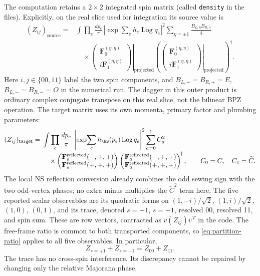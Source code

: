 The computation retains a $2\times2$ integrated spin matrix
(called \texttt{density} in the files). Explicitly, on the real
slice used for integration its source value is
\begin{align}
 (Z_{ij})_{\mathrm{source}}
 ={}&\int\prod_e\frac{dp_e}{\pi}\,
 \left|\exp\!\sum_e h_e\operatorname{Log}q_e\right|^2
 \sum_{\eta=\pm1}\frac{B_{L,\eta}B_{R,\eta}}4\nonumber\\[-2pt]
 &\quad\times
 \left.\begin{pmatrix}\mathbf F_0^{(\eta,\eta)}\\
                      i\mathbf F_1^{(\eta,\eta)}\end{pmatrix}
       \right|_{\mathrm{projected}}
 \left(\left.\begin{pmatrix}\mathbf F_0^{(\eta,\eta)}\\
                      i\mathbf F_1^{(\eta,\eta)}\end{pmatrix}
       \right|_{\mathrm{projected}}\right)^{\!\dagger}.
 \label{eq:partition-source-density}
\end{align}
Here $i,j\in\{00,11\}$ label the two spin components, and
$B_{L,+}=B_{R,+}=E$, $B_{L,-}=B_{R,-}=O$ in the numerical run.
The dagger in this outer product is ordinary complex conjugate
transpose on this real slice, not the bilinear BPZ operation.
The target matrix uses its own momenta, primary factor and
plumbing parameters:
\begin{align}
 (Z_{ij})_{\mathrm{target}}
 ={}&\int\prod_e\frac{dp_e}{\pi}\,
 \left|\exp\!\sum_e h_{\NS}(p_e)\operatorname{Log}q_e\right|^2
 \sum_{a=0}^1 C_a^2\nonumber\\[-2pt]
 &\quad\times
 \begin{pmatrix}\mathbf F_a^{\mathrm{reflected}}(-,+,+)\\
                 \mathbf F_a^{\mathrm{reflected}}(+,+,+)\end{pmatrix}
 \begin{pmatrix}\mathbf F_a^{\mathrm{reflected}}(-,+,+)\\
                 \mathbf F_a^{\mathrm{reflected}}(+,+,+)\end{pmatrix}^{\!\dagger},
 \qquad C_0=C,\quad C_1=\widetilde C.
 \label{eq:partition-target-density}
\end{align}
The local NS reflection conversion already combines the odd
sewing sign with the two odd-vertex phases; no extra minus
multiplies the $\widetilde C^2$ term here.
The five reported scalar
observables are its quadratic forms on
$(1,-i)/\sqrt2$, $(1,i)/\sqrt2$, $(1,0)$, $(0,1)$, and its
trace, denoted $s=+1$, $s=-1$, resolved 00, resolved 11, and
spin sum. These are row vectors, contracted as
$v(Z_{ij})\overline v^{\,T}$ in the code. The free-frame
ratio is common to both transported components, so
\eqref{eq:partition-ratio} applies to all five observables.
In particular,
\begin{equation}
 Z_{s=+1}+Z_{s=-1}=Z_{00}+Z_{11}.
 \label{eq:partition-spin-sum}
\end{equation}
The trace has no cross-spin interference. Its discrepancy cannot
be repaired by changing only the relative Majorana phase.

